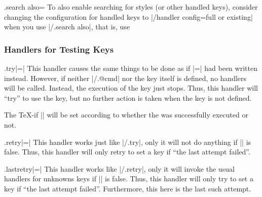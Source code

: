 \begin{handler}{{.search also}=}
    To also enable searching for styles (or other handled keys), consider
    changing the configuration for handled keys to
    |/handler config=full or existing| when you use |/.search also|, that is,
    use
\begin{codeexample}
\end{codeexample}
\end{handler}


\subsubsection{Handlers for Testing Keys}

\begin{handler}{{.try}|=|}
    This handler causes the same things to be done as if
    |=| had been written instead. However, if neither
    |/.@cmd| nor the key itself is defined, no handlers will be
    called. Instead, the execution of the key just stops. Thus, this handler
    will ``try'' to use the key, but no further action is taken when the key is
    not defined.

    The \TeX-if |\ifpgfkeyssuccess| will be set according to whether the
     was successfully executed or not.
\begin{codeexample}[]
\end{codeexample}
\end{handler}

\begin{handler}{{.retry}|=|}
    This handler works just like |/.try|, only it will not do anything if
    |\ifpgfkeyssuccess| is false. Thus, this handler will only retry to set a
    key if ``the last attempt failed''.
\begin{codeexample}[]
\end{codeexample}
\end{handler}

\begin{handler}{{.lastretry}|=|}
    This handler works like |/.retry|, only it will invoke the usual handlers
    for unknowns keys if |\ifpgfkeyssuccess| is false. Thus, this handler
    will only try to set a key if ``the last attempt failed''. Furthermore,
    this here is the last such attempt.
\end{handler}


